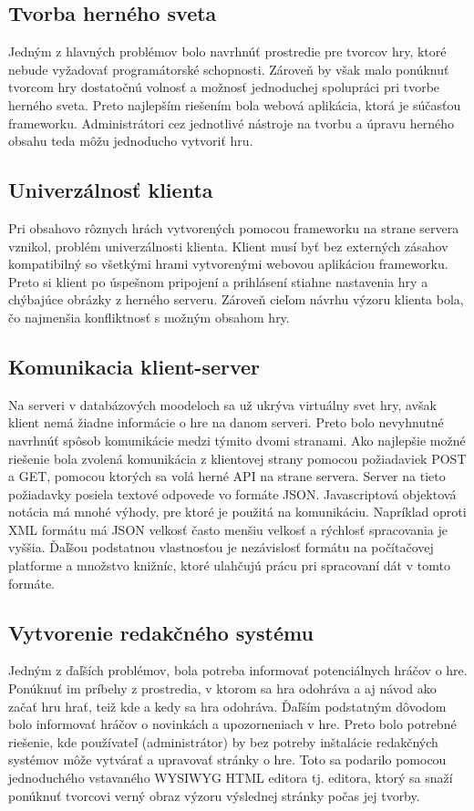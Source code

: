 \subsection{Tvorba herného sveta}
Jedným z hlavných problémov bolo navrhnúť prostredie pre tvorcov hry, ktoré nebude vyžadovať programátorské schopnosti. Zároveň by však malo ponúknuť tvorcom hry dostatočnú volnosť a možnosť jednoduchej spolupráci pri tvorbe herného sveta. Preto najlepším riešením bola webová aplikácia, ktorá je súčasťou frameworku. Administrátori cez jednotlivé nástroje na tvorbu a úpravu herného obsahu teda môžu jednoducho vytvoriť hru. 

\subsection{Univerzálnosť klienta}
Pri obsahovo rôznych hrách vytvorených pomocou frameworku na strane servera vznikol, problém univerzálnosti klienta. Klient musí byť bez externých zásahov kompatibilný so všetkými hrami vytvorenými webovou aplikáciou frameworku. Preto si klient po úspešnom pripojení a prihlásení stiahne nastavenia hry a chýbajúce obrázky z herného serveru. Zároveň cieľom návrhu výzoru klienta bola, čo najmenšia konfliktnosť s možným obsahom hry.

\subsection{Komunikacia klient-server}
Na serveri v databázových moodeloch sa už ukrýva virtuálny svet hry, avšak klient nemá žiadne informácie o hre na danom serveri. Preto bolo nevyhnutné navrhnúť spôsob komunikácie medzi týmito dvomi stranami. Ako najlepšie možné riešenie bola zvolená komunikácia z klientovej strany pomocou požiadaviek POST a GET, pomocou ktorých sa volá herné API na strane servera. Server na tieto požiadavky posiela textové odpovede vo formáte JSON. Javascriptová objektová notácia má mnohé výhody, pre ktoré je použitá na komunikáciu. Napríklad oproti XML formátu má JSON velkosť často menšiu velkosť a rýchlosť spracovania je vyššia. \cite{jsonVsXml} Ďaľšou podstatnou vlastnosťou je nezávislosť formátu na počítačovej platforme a množstvo knižníc, ktoré ulahčujú prácu pri spracovaní dát v tomto formáte.

\subsection{Vytvorenie redakčného systému}
Jedným z ďaľších problémov, bola potreba informovať potenciálnych hráčov o hre. Ponúknuť im príbehy z prostredia, v ktorom sa hra odohráva a aj návod ako začať hru hrať, teiž kde a kedy sa hra odohráva. Ďaľším podstatným dôvodom bolo informovať hráčov o novinkách a upozorneniach v hre. Preto bolo potrebné riešenie, kde používateľ (administrátor) by bez potreby inštalácie redakčných systémov môže vytvárať a upravovať stránky o hre. Toto sa podarilo pomocou jednoduchého vstavaného WYSIWYG HTML editora  tj. editora, ktorý sa snaží ponúknuť tvorcovi verný obraz výzoru výslednej stránky počas jej tvorby.

